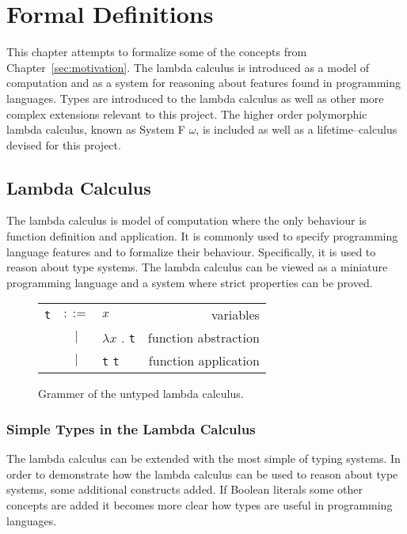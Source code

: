 \chapter{Formal Definitions}\label{sec:formal}
This chapter attempts to formalize some of the concepts from Chapter~\ref{sec:motivation}.
The lambda calculus is introduced as a model of computation and as a system for
reasoning about features found in programming languages. Types are introduced
to the lambda calculus as well as other more complex extensions relevant to
this project. The higher order polymorphic lambda calculus, known as
System F $\omega$, is included as well as a lifetime--calculus devised for this
project.

\section{Lambda Calculus}\label{sec:lambdacalc}
The lambda calculus is model of computation where the only behaviour is
function definition and application. It is commonly used to specify programming
language features and to formalize their behaviour. Specifically, it is used to
reason about type systems. The lambda calculus can be viewed as a miniature
programming language and a system where strict properties can be proved.

\begin{figure}[H]\label{fig:lambdaCalc}
    \begin{tabular}{l c p{3cm} r}
        \texttt{t} & $ ::= $ & $ x $ &                   variables \\
      & $ | $ & $ \lambda x $ . \texttt{t} &          function abstraction \\
      & $ | $ & \texttt{t} \texttt{t} &          function application \\
    \end{tabular}
    \caption{Grammer of the untyped lambda calculus.}
\end{figure}

\subsection{Simple Types in the Lambda Calculus}
The lambda calculus can be extended with the most simple of typing systems.
In order to demonstrate how the lambda calculus can be used to reason about
type systems, some additional constructs added. If Boolean literals some other
concepts are added it becomes more clear how types are useful in programming
languages.

